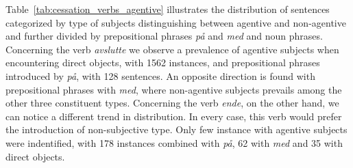 \documentclass{article}
\begin{document}
Table~\ref{tab:cessation_verbs_agentive} illustrates the distribution of sentences categorized by type of subjects distinguishing between agentive and non-agentive and further divided by prepositional phrases \emph{på} and \emph{med} and noun phrases. Concerning the verb \emph{avslutte} we observe a prevalence of agentive subjects when encountering direct objects, with 1562 instances, and prepositional phrases introduced by \emph{på}, with 128 sentences. An opposite direction is found with prepositional phrases with \emph{med}, where non-agentive subjects prevails among the other three constituent types. Concerning the verb \emph{ende}, on the other hand, we can notice a different trend in distribution. In every case, this verb would prefer the introduction of non-subjective type. Only few instance with agentive subjects were indentified, with 178 instances combined with \emph{på}, 62 with \emph{med} and 35 with direct objects.  
\end{document}
